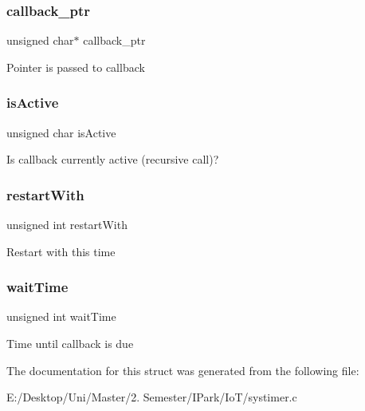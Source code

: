 \subsubsection{\texorpdfstring{callback\+\_\+ptr}{callback\_ptr}}
{\footnotesize\ttfamily unsigned char$\ast$ callback\+\_\+ptr}

Pointer is passed to callback \mbox{\label{structtmr__callback_a45a2bb46f70a64688f7c9ada4b28a0cb}} 
\subsubsection{\texorpdfstring{is\+Active}{isActive}}
{\footnotesize\ttfamily unsigned char is\+Active}

Is callback currently active (recursive call)? \mbox{\label{structtmr__callback_ab5e3bcb44e429e65c5e0a9eacd064049}} 
\subsubsection{\texorpdfstring{restart\+With}{restartWith}}
{\footnotesize\ttfamily unsigned int restart\+With}

Restart with this time \mbox{\label{structtmr__callback_a3dd2bf8b269e3fa033cdf888d425c0a1}} 
\subsubsection{\texorpdfstring{wait\+Time}{waitTime}}
{\footnotesize\ttfamily unsigned int wait\+Time}

Time until callback is due 

The documentation for this struct was generated from the following file\+:\begin{DoxyCompactItemize}
\item 
E\+:/\+Desktop/\+Uni/\+Master/2. Semester/\+I\+Park/\+Io\+T/systimer.\+c\end{DoxyCompactItemize}
